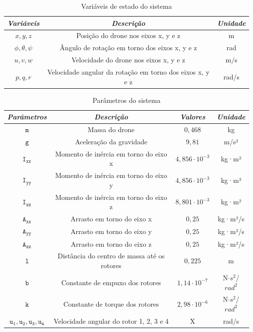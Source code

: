 \begin{table}[h!]
    \centering
    \caption{Variáveis de estado do sistema}
    \begin{tabular}{|c|c|c|}
        \hline
        \emph{Variáveis} & \emph{Descrição} & \emph{Unidade} \\ \hline
        ${x, y, z}$& Posição do drone nos eixos x, y e z & m \\ \hline
        ${\phi, \theta, \psi}$& Ângulo de rotação em torno dos eixos x, y e z & rad \\ \hline
        ${u, v, w}$& Velocidade do drone nos eixos x, y e z & m/s \\ \hline
        ${p, q, r}$& Velocidade angular da rotação em torno dos eixos x, y e z & rad/s \\ \hline
    \end{tabular}
    \label{tab:vars}
\end{table}

\vspace{-1cm}

\begin{center}
    \begin{longtable}{|c|c|c|c|} %
        \caption{Parâmetros do sistema} \vspace{-0.7cm}
        \label{tab:params}
        \hline
        \emph{Parâmetros} & \emph{Descrição} & \emph{Valores} & \emph{Unidade} \\
        \hline
        \endfirsthead
        \endhead

        $\mathtt{m}$ & Massa do drone & $0,468$ &kg \\ \hline
        $\mathtt{g}$ & Aceleração da gravidade & $9,81$ & m/s² \\ \hline
        $\mathtt{I_{xx}}$ & Momento de inércia em torno do eixo x & $4,856 \cdot 10^{-3}$ & kg·m² \\ \hline
        $\mathtt{I_{yy}}$ & Momento de inércia em torno do eixo y & $4,856 \cdot 10^{-3}$ & kg·m² \\ \hline
        $\mathtt{I_{zz}}$ & Momento de inércia em torno do eixo z & $8,801 \cdot 10^{-3}$ & kg·m² \\ \hline
        $\mathtt{A_{xx}}$ & Arrasto em torno do eixo x & $0,25$ & kg·m²/s \\ \hline
        $\mathtt{A_{yy}}$ & Arrasto em torno do eixo y & $0,25$ & kg·m²/s \\ \hline
        $\mathtt{A_{zz}}$ & Arrasto em torno do eixo z & $0,25$ & kg·m²/s \\ \hline
        $\mathtt{l}$ & Distância do centro de massa até os rotores & $0,225$ & m \\ \hline
        $\mathtt{b}$ & Constante de empuxo dos rotores & $1,14 \cdot 10^{-7}$ & N$\cdot s^{2}$/$rad^{2}$ \\ \hline
        $\mathtt{k}$ & Constante de torque dos rotores & $2,98 \cdot 10^{-6}$ & N$\cdot s^{2}$/$rad^{2}$ \\ \hline
        $\mathtt{u_1, u_2, u_3, u_4}$ & Velocidade angular do rotor 1, 2, 3 e 4 & X & rad/s \\ \hline
    \end{longtable}
\end{center}

